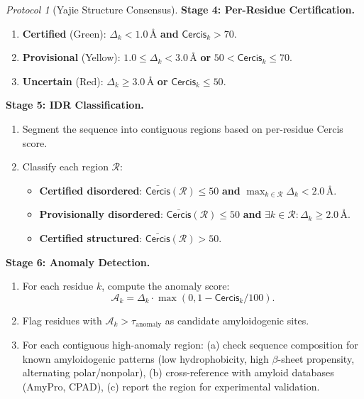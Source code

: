 \documentclass[12pt,a4paper]{article}
\theoremstyle{remark}
\newtheorem{protocol}[theorem]{Protocol}
\newcommand{\Cercis}{\textsf{Cercis}}
\begin{document}
\begin{protocol}[Yajie Structure Consensus]
\medskip\noindent\textbf{Stage 4: Per-Residue Certification.}
\begin{enumerate}[leftmargin=*]
    \item \textbf{Certified} (Green): $\Delta_k < 1.0$\,\AA{} \textbf{and} $\Cercis_k > 70$.
    \item \textbf{Provisional} (Yellow): $1.0 \leq \Delta_k < 3.0$\,\AA{} \textbf{or} $50 < \Cercis_k \leq 70$.
    \item \textbf{Uncertain} (Red): $\Delta_k \geq 3.0$\,\AA{} \textbf{or} $\Cercis_k \leq 50$.
\end{enumerate}

\medskip\noindent\textbf{Stage 5: IDR Classification.}
\begin{enumerate}[leftmargin=*]
    \item Segment the sequence into contiguous regions based on per-residue Cercis score.
    \item Classify each region $\mathcal{R}$:
    \begin{itemize}[leftmargin=*]
        \item \textbf{Certified disordered}: $\bar{\Cercis}(\mathcal{R}) \leq 50$ \textbf{and} $\max_{k \in \mathcal{R}} \Delta_k < 2.0$\,\AA.
        \item \textbf{Provisionally disordered}: $\bar{\Cercis}(\mathcal{R}) \leq 50$ \textbf{and} $\exists k \in \mathcal{R}: \Delta_k \geq 2.0$\,\AA.
        \item \textbf{Certified structured}: $\bar{\Cercis}(\mathcal{R}) > 50$.
    \end{itemize}
\end{enumerate}

\medskip\noindent\textbf{Stage 6: Anomaly Detection.}
\begin{enumerate}[leftmargin=*]
    \item For each residue $k$, compute the anomaly score:
    \begin{equation}
        \mathcal{A}_k = \Delta_k \cdot \max(0, 1 - \Cercis_k / 100).
    \end{equation}
    \item Flag residues with $\mathcal{A}_k > \tau_{\text{anomaly}}$ as candidate amyloidogenic sites.
    \item For each contiguous high-anomaly region: (a) check sequence composition for known amyloidogenic patterns (low hydrophobicity, high $\beta$-sheet propensity, alternating polar/nonpolar), (b) cross-reference with amyloid databases (AmyPro, CPAD), (c) report the region for experimental validation.
\end{enumerate}
\end{protocol}
\end{document}
